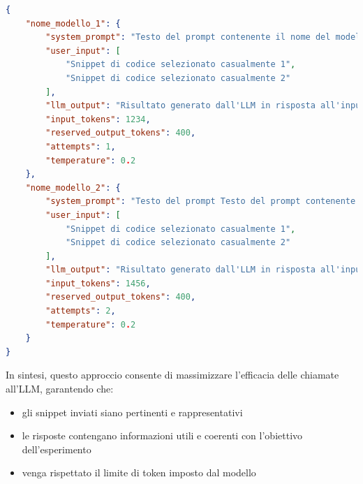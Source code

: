 \documentclass{article}
\begin{document}
\begin{lstlisting}[language=json, caption={Esempio di struttura JSON nella risposta dell'LLM}, label={lst:json-llm}]
{
    "nome_modello_1": {
        "system_prompt": "Testo del prompt contenente il nome del modello 1",
        "user_input": [
            "Snippet di codice selezionato casualmente 1",
            "Snippet di codice selezionato casualmente 2"
        ],
        "llm_output": "Risultato generato dall'LLM in risposta all'input fornito",
        "input_tokens": 1234,
        "reserved_output_tokens": 400,
        "attempts": 1,
        "temperature": 0.2
    },
    "nome_modello_2": {
        "system_prompt": "Testo del prompt Testo del prompt contenente il nome del modello 2",
        "user_input": [
            "Snippet di codice selezionato casualmente 1",
            "Snippet di codice selezionato casualmente 2"
        ],
        "llm_output": "Risultato generato dall'LLM in risposta all'input fornito",
        "input_tokens": 1456,
        "reserved_output_tokens": 400,
        "attempts": 2,
        "temperature": 0.2
    }
}
\end{lstlisting}
In sintesi, questo approccio consente di massimizzare l’efficacia delle chiamate all’LLM, garantendo che:
\begin{itemize}
    \item gli snippet inviati siano pertinenti e rappresentativi
    \item le risposte contengano informazioni utili e coerenti con l’obiettivo dell’esperimento
    \item venga rispettato il limite di token imposto dal modello
\end{itemize}
\end{document}
